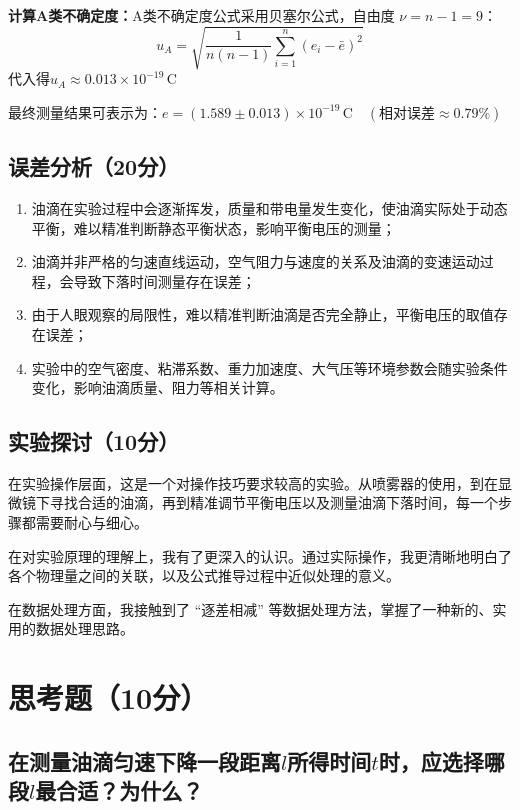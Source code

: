 \documentclass[yuxi]{../../templates/Report}%
\begin{document}
\begin{fullreportonly}
\vspace{2mm}
\textbf{计算A类不确定度：}A类不确定度公式采用贝塞尔公式，自由度 \( \nu = n-1 = 9 \)：
\[u_A = \sqrt{\frac{1}{n(n-1)} \sum_{i=1}^n (e_i - \bar{e})^2}\]
代入得$u_A \approx 0.013 \times 10^{-19} \, \text{C}$

\vspace{2mm}
最终测量结果可表示为：\(e = (1.589 \pm 0.013) \times 10^{-19} \, \text{C} \quad (\text{相对误差} \approx 0.79\%)\)
\subsection{误差分析（20分）}
\begin{enumerate}
    \item 油滴在实验过程中会逐渐挥发，质量和带电量发生变化，使油滴实际处于动态平衡，难以精准判断静态平衡状态，影响平衡电压的测量；
    \item 油滴并非严格的匀速直线运动，空气阻力与速度的关系及油滴的变速运动过程，会导致下落时间测量存在误差；
    \item 由于人眼观察的局限性，难以精准判断油滴是否完全静止，平衡电压的取值存在误差；
    \item 实验中的空气密度、粘滞系数、重力加速度、大气压等环境参数会随实验条件变化，影响油滴质量、阻力等相关计算。
\end{enumerate}

\subsection{实验探讨（10分）}
在实验操作层面，这是一个对操作技巧要求较高的实验。从喷雾器的使用，到在显微镜下寻找合适的油滴，再到精准调节平衡电压以及测量油滴下落时间，每一个步骤都需要耐心与细心。

\vspace{2mm}
在对实验原理的理解上，我有了更深入的认识。通过实际操作，我更清晰地明白了各个物理量之间的关联，以及公式推导过程中近似处理的意义。

\vspace{2mm}
在数据处理方面，我接触到了 “逐差相减” 等数据处理方法，掌握了一种新的、实用的数据处理思路。

\section{思考题（10分）}
\subsection{在测量油滴匀速下降一段距离$l$所得时间$t$时，应选择哪段$l$最合适？为什么？}


\end{fullreportonly}
\end{document}
